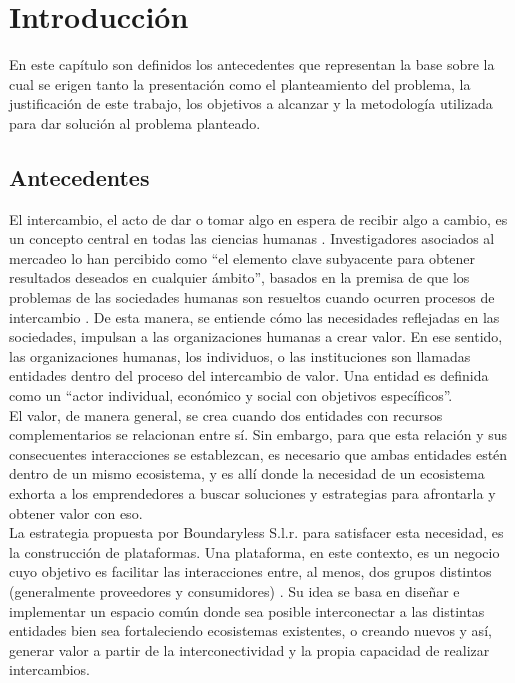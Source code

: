 \chapter{Introducción}

En este capítulo son definidos los antecedentes que representan la base sobre la cual se erigen tanto la presentación como el planteamiento del problema, la justificación de este trabajo, los objetivos a alcanzar y la metodología utilizada para dar solución al problema planteado.

\section{Antecedentes}

El intercambio, el acto de dar o tomar algo en espera de recibir algo a cambio, es un concepto central en todas las ciencias humanas  \cite{Anderson1999}. Investigadores asociados al mercadeo lo han percibido como “el elemento clave subyacente para obtener resultados deseados en cualquier ámbito”, basados en la premisa de que los problemas de las sociedades humanas son resueltos cuando ocurren procesos de intercambio \cite{Bagozzi1994}. De esta manera, se entiende cómo las necesidades reflejadas en las sociedades, impulsan a las organizaciones humanas a crear valor. En ese sentido, las organizaciones humanas, los individuos, o las instituciones son llamadas entidades dentro del proceso del intercambio de valor. Una entidad es definida como un “actor individual, económico y social con objetivos específicos”.
\\
El valor, de manera general, se crea cuando dos entidades con recursos complementarios se relacionan entre sí. Sin embargo, para que esta relación y sus consecuentes interacciones se establezcan, es necesario que ambas entidades estén dentro de un mismo ecosistema, y es allí donde la necesidad de un ecosistema exhorta a los emprendedores a buscar soluciones y estrategias para afrontarla y obtener valor con eso.
\\
La estrategia propuesta por Boundaryless S.l.r. \cite{boundarylessplatform} para satisfacer esta necesidad, es la construcción de plataformas. Una plataforma, en este contexto, es un negocio cuyo objetivo es facilitar las interacciones entre, al menos, dos grupos distintos (generalmente proveedores y consumidores) \cite{noauthor_itif_2018} . Su idea se basa en diseñar e implementar un espacio común donde sea  posible interconectar a las distintas entidades bien sea fortaleciendo ecosistemas existentes, o creando nuevos y así, generar valor a partir de la interconectividad y la propia capacidad de realizar intercambios. 
